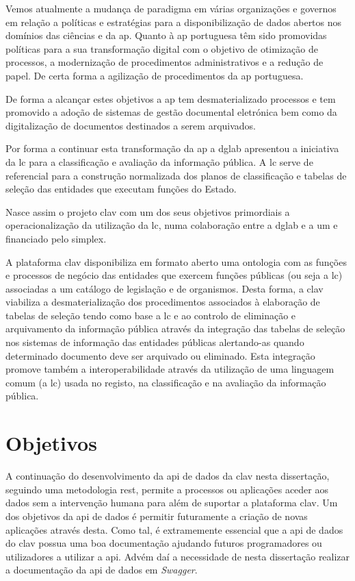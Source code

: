 Vemos atualmente a mudança de paradigma em várias organizações e governos em relação a políticas e estratégias para a disponibilização de dados abertos nos domínios das ciências e da \acrlong{ap}. Quanto à \acrlong{ap} portuguesa têm sido promovidas políticas para a sua transformação digital com o objetivo de otimização de processos, a modernização de procedimentos administrativos e a redução de papel. De certa forma a agilização de procedimentos da \acrlong{ap} portuguesa.~\cite{clav}

De forma a alcançar estes objetivos a \acrfull{ap} tem desmaterializado processos e tem promovido a adoção de sistemas de gestão documental eletrónica bem como da digitalização de documentos destinados a serem arquivados.~\cite{clav}

Por forma a continuar esta transformação da \acrshort{ap} a \acrfull{dglab} apresentou a iniciativa da \acrfull{lc} para a classificação e avaliação da informação pública. A \acrshort{lc} serve de referencial para a construção normalizada dos planos de classificação e tabelas de seleção das entidades que executam funções do Estado.~\cite{clav}

Nasce assim o projeto \acrfull{clav} com um dos seus objetivos primordiais a operacionalização da utilização da \acrshort{lc}, numa colaboração entre a \acrshort{dglab} e a \acrfull{um} e financiado pelo \Gls{simplex}.~\cite{clav}

A plataforma \acrshort{clav} disponibiliza em formato aberto uma \gls{ontologia} com as funções e processos de negócio das entidades que exercem funções públicas (ou seja a \acrshort{lc}) associadas a um catálogo de legislação e de organismos. Desta forma, a \acrshort{clav} viabiliza a desmaterialização dos procedimentos associados à elaboração de tabelas de seleção tendo como base a \acrshort{lc} e ao controlo de eliminação e arquivamento da informação pública através da integração das tabelas de seleção nos sistemas de informação das entidades públicas alertando-as quando determinado documento deve ser arquivado ou eliminado. Esta integração promove também a interoperabilidade através da utilização de uma linguagem comum (a \acrshort{lc}) usada no registo, na classificação e na avaliação da informação pública.~\cite{clav}

\section{Objetivos}

A continuação do desenvolvimento da \acrshort{api} de dados da \acrshort{clav} nesta dissertação, seguindo uma metodologia \acrshort{rest}, permite a processos ou aplicações aceder aos dados sem a intervenção humana para além de suportar a plataforma \acrshort{clav}. Um dos objetivos da \acrshort{api} de dados é permitir futuramente a criação de novas aplicações através desta. Como tal, é extramemente essencial que a \acrshort{api} de dados do \acrshort{clav} possua uma boa documentação ajudando futuros programadores ou utilizadores a utilizar a \acrshort{api}. Advém daí a necessidade de nesta dissertação realizar a documentação da \acrshort{api} de dados em \textit{Swagger}.

